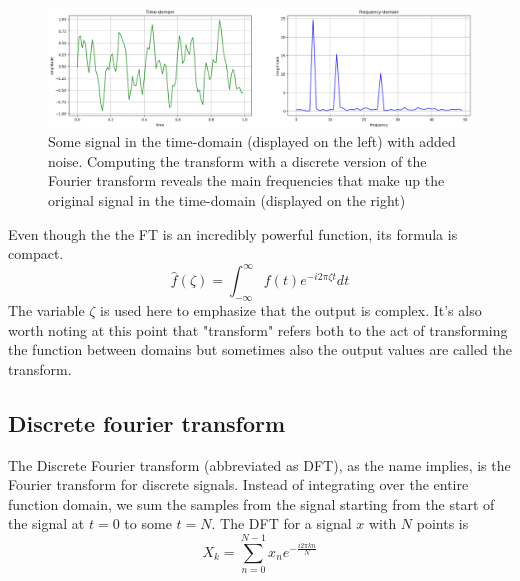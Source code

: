 \begin{figure}[ht]
    \centering
    \includegraphics[width=\textwidth]{./images/transform.png}
    \caption{Some signal in the time-domain (displayed on the left) with added noise. Computing the transform with a discrete version of the Fourier transform reveals the main frequencies that make up the original signal in the time-domain (displayed on the right)\label{fig:transform}}
\end{figure}

Even though the the FT is an incredibly powerful function, its formula is compact. 
$$\hat{f}(\zeta) = \int_{-\infty}^{\infty} f(t)e^{-i2\pi\zeta t} dt$$
The variable $\zeta$ is used here to emphasize that the output is complex. It's also worth noting at this point that "transform" refers both to the act of transforming the function between domains but sometimes also the output values are called the transform.


\subsection{Discrete fourier transform} 
The Discrete Fourier transform (abbreviated as DFT), as the name implies, is the Fourier transform for discrete signals. Instead of integrating over the entire function domain, we sum the samples from the signal starting from the start of the signal at $t=0$ to some $t=N$. The DFT for a signal $x$ with $N$ points is 
$$X_k = \sum_{n=0}^{N-1} x_ne^{-\frac{i2\pi kn}{N}}$$

